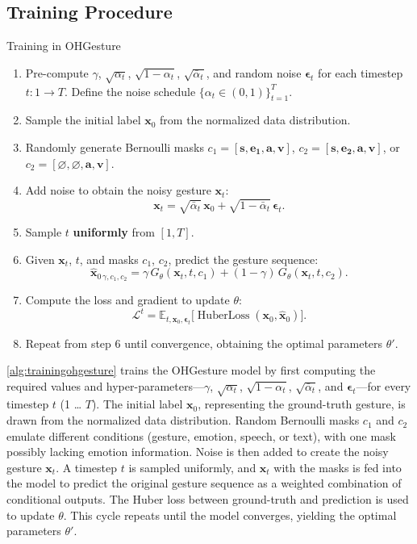 \subsection{Training Procedure}

\begin{algorithm}[H]
	\caption{Training in OHGesture}
	\label{alg:trainingohgesture}
	\setlength{\baselineskip}{10pt}
	\begin{enumerate}
		\item Pre-compute $\gamma$, $\sqrt{\alpha_t}$, $\sqrt{1-\alpha_t}$, $\sqrt{\bar{\alpha}_t}$, and random noise $\boldsymbol{\epsilon}_t$ for each timestep $t: 1 \rightarrow T$. Define the noise schedule $\{\alpha_t \in (0,1)\}_{t=1}^T$.
		\item Sample the initial label $\mathbf{x}_0$ from the normalized data distribution.
		\item Randomly generate Bernoulli masks
		      $c_{1} = [ \mathbf{s}, \mathbf{e_1}, \mathbf{a}, \mathbf{v} ]$,
		      $c_{2} = [ \mathbf{s}, \mathbf{e_2}, \mathbf{a}, \mathbf{v} ]$, or
		      $c_{2} = [ \varnothing, \varnothing, \mathbf{a}, \mathbf{v} ]$.
		\item Add noise to obtain the noisy gesture $\mathbf{x}_t$:
		      \[
		      \mathbf{x}_t = \sqrt{\bar{\alpha}_t}\,\mathbf{x}_0 + \sqrt{1-\bar{\alpha}_t}\,\boldsymbol{\epsilon}_t.
		      \]
		\item Sample $t$ \textbf{uniformly} from $[1, T]$.
		\item Given $\mathbf{x}_t$, $t$, and masks $c_1$, $c_2$, predict the gesture sequence:
		      \[
		      \hat{\mathbf{x}}_{0\,\gamma,c_{1},c_{2}}
		          = \gamma\, G_{\theta}(\mathbf{x}_{t}, t, c_{1})
		          + (1-\gamma)\, G_{\theta}(\mathbf{x}_{t}, t, c_{2}).
		      \]
		\item Compute the loss and gradient to update $\theta$:
		      \[
		      \mathcal{L}^t
		          = \mathbb{E}_{t, \mathbf{x}_0, \boldsymbol{\epsilon}_t}
		            \bigl[\operatorname{HuberLoss}(\mathbf{x}_0, \hat{\mathbf{x}}_0)\bigr].
		      \]
		\item Repeat from step 6 until convergence, obtaining the optimal parameters $\theta'$.
	\end{enumerate}
\end{algorithm}

\autoref{alg:trainingohgesture} trains the OHGesture model by first computing the required values and hyper-parameters—$\gamma$, $\sqrt{\alpha_t}$, $\sqrt{1-\alpha_t}$, $\sqrt{\bar{\alpha}_t}$, and $\boldsymbol{\epsilon}_t$—for every timestep $t$ (1 … $T$).  
The initial label $\mathbf{x}_0$, representing the ground-truth gesture, is drawn from the normalized data distribution.  
Random Bernoulli masks $c_1$ and $c_2$ emulate different conditions (gesture, emotion, speech, or text), with one mask possibly lacking emotion information.  
Noise is then added to create the noisy gesture $\mathbf{x}_t$.  
A timestep $t$ is sampled uniformly, and $\mathbf{x}_t$ with the masks is fed into the model to predict the original gesture sequence as a weighted combination of conditional outputs.  
The Huber loss between ground-truth and prediction is used to update $\theta$.  
This cycle repeats until the model converges, yielding the optimal parameters $\theta'$.

